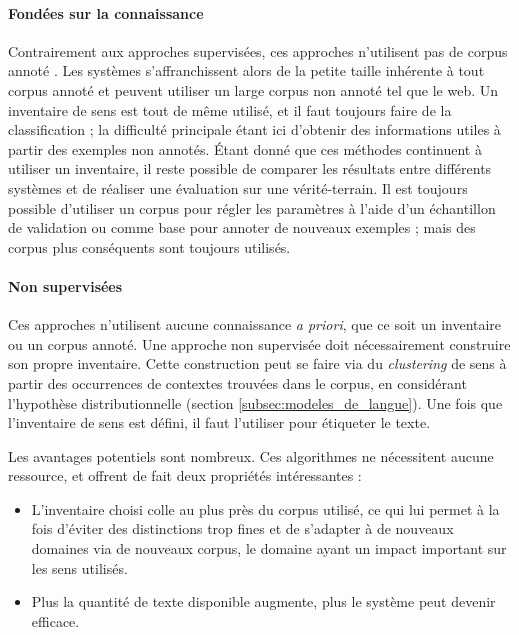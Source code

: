 
\paragraph{Fondées sur la connaissance}

Contrairement aux approches supervisées, ces approches n'utilisent pas de
corpus annoté \citep{swier2005exploiting,pradet2013revisiting}. Les systèmes
s'affranchissent alors de la petite taille inhérente à tout corpus annoté et
peuvent utiliser un large corpus non annoté tel que le web. Un inventaire de
sens est tout de même utilisé, et il faut toujours faire de la classification ;
la difficulté principale étant ici d'obtenir des informations utiles à partir
des exemples non annotés. Étant donné que ces méthodes continuent à utiliser un
inventaire, il reste possible de comparer les résultats entre différents
systèmes et de réaliser une évaluation sur une vérité-terrain. Il est toujours
possible d'utiliser un corpus pour régler les paramètres à l'aide d'un
échantillon de validation ou comme base pour annoter de nouveaux exemples ;
mais des corpus plus conséquents sont toujours utilisés.

\paragraph{Non supervisées}

Ces approches n'utilisent aucune connaissance \textit{a priori}, que ce soit un
inventaire ou un corpus annoté. Une approche non supervisée doit nécessairement
construire son propre inventaire. Cette construction peut se faire via du
\textit{clustering} de sens à partir des occurrences de contextes trouvées dans
le corpus, en considérant l'hypothèse distributionnelle (section
\ref{subsec:modeles_de_langue}). Une fois que l'inventaire de sens est défini, il
faut l'utiliser pour étiqueter le texte.

Les avantages potentiels sont nombreux. Ces algorithmes ne nécessitent aucune
ressource, et offrent de fait deux propriétés intéressantes :

\begin{itemize}

    \item L'inventaire choisi colle au plus près du corpus utilisé, ce qui lui
        permet à la fois d'éviter des distinctions trop fines et de s'adapter à
        de nouveaux domaines via de nouveaux corpus, le domaine ayant un impact
        important sur les sens utilisés.

    \item Plus la quantité de texte disponible augmente, plus le système peut
        devenir efficace.

\end{itemize}


